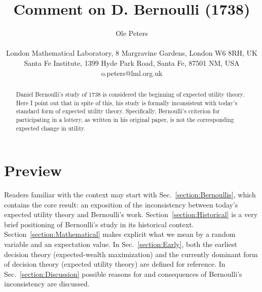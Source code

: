 \documentclass[pdftex]{article}
\newcommand{\secref}[1]{Sec.~\ref{section:#1}}
\newcommand{\Secref}[1]{Section~\ref{section:#1}}
\begin{document}

\title{Comment on D. Bernoulli (1738)}
\author{Ole Peters\\
\\
{\small London Mathematical Laboratory, 8 Margravine Gardens, London W6 8RH, UK}\\
{\small Santa Fe Institute, 1399 Hyde Park Road, Santa Fe, 87501 NM, USA}\\
{\small o.peters@lml.org.uk}}
\maketitle


\begin{abstract}
Daniel Bernoulli's study of 1738 is considered the beginning of expected utility theory. Here I point out that in spite of this, his study is formally inconsistent with today's standard form of expected utility theory. Specifically, Bernoulli's criterion for participating in a lottery, as written in his original paper, is not the corresponding expected change in utility. 
\end{abstract}

\section{Preview}
Readers familiar with the context may start with \secref{Bernoullis},  which contains the core result: an exposition of the inconsistency between today's expected utility theory and Bernoulli's work. \Secref{Historical} is a very brief positioning of Bernoulli's study in its historical context. \Secref{Mathematical} makes explicit what we mean by a random variable and an expectation value. In \secref{Early}, both the earliest decision theory (expected-wealth maximization) and the currently dominant form of decision theory (expected utility theory) are defined for reference. In \secref{Discussion} possible reasons for and consequences of Bernoulli's inconsistency are discussed.
 
\end{document}
